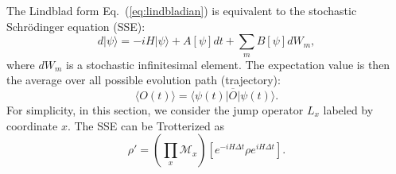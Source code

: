 \documentclass{SciPost}
\begin{document}
The Lindblad form Eq.~(\ref{eq:lindbladian}) is equivalent to the stochastic Schr\"{o}dinger equation (SSE):
\begin{equation}
	d|\psi\rangle = -iH|\psi\rangle + A[\psi]dt + \sum_m B[\psi]dW_m,
\end{equation}
where $dW_m$ is a stochastic infinitesimal element. The expectation value is then the average over all possible evolution path (trajectory): 
$$\langle O(t) \rangle = \overline{\langle\psi(t)|O|\psi(t)\rangle}.$$
For simplicity, in this section, we consider the jump operator $L_x$ labeled by coordinate $x$. 
The SSE can be Trotterized as
\begin{equation}
	\rho' = \left(\prod_x \mathcal{M}_{x} \right) \left[e^{-iH\Delta t} \rho e^{iH\Delta t}\right].
\end{equation}
\end{document}
